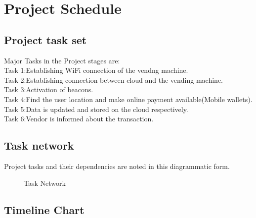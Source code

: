 \documentclass[oneside,a4paper,12pt]{report}
\begin{document}
\section{Project Schedule}  
\subsection{Project task set}  
Major Tasks in the Project stages are:\\
Task 1:Establishing WiFi connection of the vendng machine.\\
Task 2:Establishing connection between cloud and the vending machine.\\
Task 3:Activation of beacons.\\
Task 4:Find the user location and make online payment available(Mobile wallets). \\
Task 5:Data is updated and stored on the cloud respectively.\\
Task 6:Vendor is informed about the transaction.\\

\subsection{Task network}  
Project tasks and their dependencies are noted in this diagrammatic form.
\begin{center}
	\begin{figure}[!htbp]
		\centering
	  \caption{Task Network}
	  \label{fig:act-dig}
	\end{figure}
\end{center}  
\newpage

\subsection{Timeline Chart}  
\end{document}
